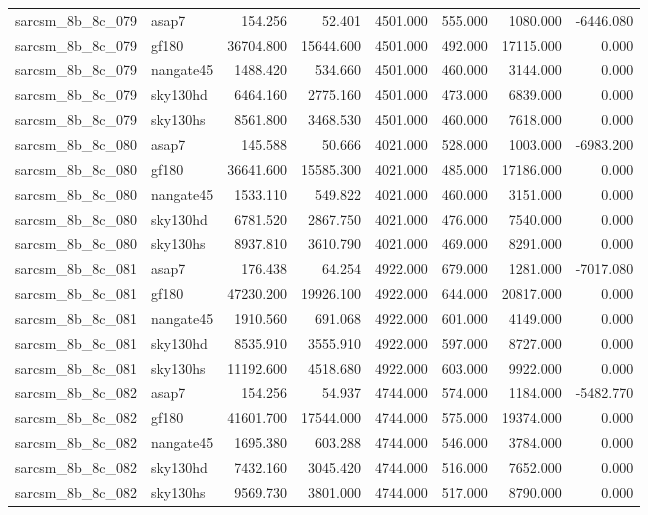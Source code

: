 \begin{tabular}{llrrrrrr}
sarcsm\_8b\_8c\_079 & asap7 & 154.256 & 52.401 & 4501.000 & 555.000 & 1080.000 & -6446.080 \\
sarcsm\_8b\_8c\_079 & gf180 & 36704.800 & 15644.600 & 4501.000 & 492.000 & 17115.000 & 0.000 \\
sarcsm\_8b\_8c\_079 & nangate45 & 1488.420 & 534.660 & 4501.000 & 460.000 & 3144.000 & 0.000 \\
sarcsm\_8b\_8c\_079 & sky130hd & 6464.160 & 2775.160 & 4501.000 & 473.000 & 6839.000 & 0.000 \\
sarcsm\_8b\_8c\_079 & sky130hs & 8561.800 & 3468.530 & 4501.000 & 460.000 & 7618.000 & 0.000 \\
sarcsm\_8b\_8c\_080 & asap7 & 145.588 & 50.666 & 4021.000 & 528.000 & 1003.000 & -6983.200 \\
sarcsm\_8b\_8c\_080 & gf180 & 36641.600 & 15585.300 & 4021.000 & 485.000 & 17186.000 & 0.000 \\
sarcsm\_8b\_8c\_080 & nangate45 & 1533.110 & 549.822 & 4021.000 & 460.000 & 3151.000 & 0.000 \\
sarcsm\_8b\_8c\_080 & sky130hd & 6781.520 & 2867.750 & 4021.000 & 476.000 & 7540.000 & 0.000 \\
sarcsm\_8b\_8c\_080 & sky130hs & 8937.810 & 3610.790 & 4021.000 & 469.000 & 8291.000 & 0.000 \\
sarcsm\_8b\_8c\_081 & asap7 & 176.438 & 64.254 & 4922.000 & 679.000 & 1281.000 & -7017.080 \\
sarcsm\_8b\_8c\_081 & gf180 & 47230.200 & 19926.100 & 4922.000 & 644.000 & 20817.000 & 0.000 \\
sarcsm\_8b\_8c\_081 & nangate45 & 1910.560 & 691.068 & 4922.000 & 601.000 & 4149.000 & 0.000 \\
sarcsm\_8b\_8c\_081 & sky130hd & 8535.910 & 3555.910 & 4922.000 & 597.000 & 8727.000 & 0.000 \\
sarcsm\_8b\_8c\_081 & sky130hs & 11192.600 & 4518.680 & 4922.000 & 603.000 & 9922.000 & 0.000 \\
sarcsm\_8b\_8c\_082 & asap7 & 154.256 & 54.937 & 4744.000 & 574.000 & 1184.000 & -5482.770 \\
sarcsm\_8b\_8c\_082 & gf180 & 41601.700 & 17544.000 & 4744.000 & 575.000 & 19374.000 & 0.000 \\
sarcsm\_8b\_8c\_082 & nangate45 & 1695.380 & 603.288 & 4744.000 & 546.000 & 3784.000 & 0.000 \\
sarcsm\_8b\_8c\_082 & sky130hd & 7432.160 & 3045.420 & 4744.000 & 516.000 & 7652.000 & 0.000 \\
sarcsm\_8b\_8c\_082 & sky130hs & 9569.730 & 3801.000 & 4744.000 & 517.000 & 8790.000 & 0.000 \\

\end{tabular}
